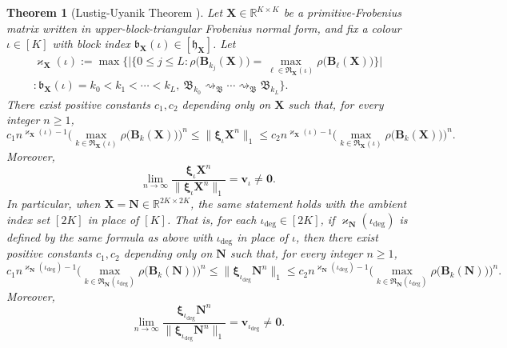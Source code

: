 \documentclass[12pt]{iopart}
\newtheorem{theorem}{Theorem}[section]
\newcommand*{\bbbxi}{\boldsymbol{\xi}}
\begin{document}
\begin{theorem}[Lustig-Uyanik Theorem \cite{lustig2016perron}]\label{thm:LU}
Let $\mathbf X\in\mathbb R^{K\times K}$ be 
a primitive-Frobenius matrix written in upper-block-triangular Frobenius normal form, 
and fix a colour $\iota\in[K]$ with block index $\mathfrak b_{\mathbf X}(\iota)\in[\mathfrak h_{\mathbf X}]$.
Let
\begin{align*}
\varkappa_{\mathbf X}(\iota) :=
\max\Big\{
   \Big|
     \big\{
       0\le j\le L:
       \rho\big(\mathbf B_{k_j}(\mathbf X)\big)
       =
       \max_{\ell\in\mathfrak R_{\mathbf X}(\iota)}
       \rho\big(\mathbf B_\ell(\mathbf X)\big)
     \big\}
   \Big| \\
   :
   \mathfrak b_{\mathbf X}(\iota)=k_0<k_1<\cdots<k_L,
   \ 
   \mathfrak B_{k_0}\rightsquigarrow_{\mathfrak B}\cdots
   \rightsquigarrow_{\mathfrak B}\mathfrak B_{k_L}
\Big\}.
\end{align*}
There exist positive constants $c_1,c_2$ depending only on $\mathbf X$
such that, for every integer $n\ge 1$,
\begin{equation}\label{eq:LU-bounds}
   c_1 
   n^{\varkappa_{\mathbf X}(\iota)-1} 
   \Big(
    \max_{k\in\mathfrak R_{\mathbf X}(\iota)}
    \rho\big(\mathbf B_k(\mathbf X)\big)
    \Big)^n
     \le  
   \Big\|\bbbxi_\iota \mathbf X^n\Big\|_1
     \le  
   c_2 
   n^{\varkappa_{\mathbf X}(\iota)-1} 
   \Big(
    \max_{k\in\mathfrak R_{\mathbf X}(\iota)}
    \rho\big(\mathbf B_k(\mathbf X)\big)
    \Big)^n.
\end{equation}
Moreover,
\begin{equation}\label{eq:LU-direction}
   \lim_{n\to\infty}
   \frac{\bbbxi_\iota \mathbf X^n}
        {\big\|\bbbxi_\iota \mathbf X^n\big\|_1}
    = 
   \mathbf v_\iota\neq\mathbf 0 .
\end{equation}
\smallskip
In particular, when $\mathbf X=\mathbf N\in\mathbb R^{2K\times 2K}$, the same statement holds with the ambient index set $[2K]$ in place of $[K]$.
That is, for each ${\iota_{\deg}}\in[2K]$, if $\varkappa_{\mathbf N}(\iota_{\deg})$ is defined by the same formula as above with $\iota_{\deg}$ in place of $\iota$, then there exist positive constants $c_1,c_2$ depending only on $\mathbf N$ such that, for every integer $n\ge 1$,
\[
   c_1 
   n^{\varkappa_{\mathbf N}(\iota_{\deg})-1} 
   \Big(
    \max_{k\in\mathfrak R_{\mathbf N}(\iota_{\deg})}
    \rho\big(\mathbf B_k(\mathbf N)\big)
    \Big)^n
     \le  
   \Big\|\bbbxi_{\iota_{\deg}} \mathbf N^n\Big\|_1
     \le  
   c_2 
   n^{\varkappa_{\mathbf N}(\iota_{\deg})-1} 
   \Big(
    \max_{k\in\mathfrak R_{\mathbf N}(\iota_{\deg})}
    \rho\big(\mathbf B_k(\mathbf N)\big)
    \Big)^n.
\]
Moreover,
\[
   \lim_{n\to\infty}
   \frac{\bbbxi_{\iota_{\deg}} \mathbf N^n}
        {\big\|\bbbxi_{\iota_{\deg}} \mathbf N^n\big\|_1}
    = 
   \mathbf v_{\iota_{\deg}}\neq\mathbf 0 .
\]
\end{theorem}
\end{document}

